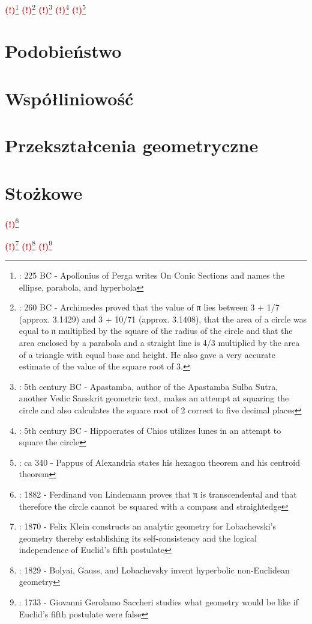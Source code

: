 \documentclass{greaseproof}
\newcommand{\todofoot}[1]{\textcolor{red}{\textbf{(!)}\footnote{\textbf{\color{red}{Do zrobienia}}: #1}}}
\begin{document}
\todofoot{225 BC - Apollonius of Perga writes On Conic Sections and names the ellipse, parabola, and hyperbola}
\todofoot{260 BC - Archimedes proved that the value of π lies between 3 + 1/7 (approx. 3.1429) and 3 + 10/71 (approx. 3.1408), that the area of a circle was equal to π multiplied by the square of the radius of the circle and that the area enclosed by a parabola and a straight line is 4/3 multiplied by the area of a triangle with equal base and height. He also gave a very accurate estimate of the value of the square root of 3.}
\todofoot{5th century BC - Apastamba, author of the Apastamba Sulba Sutra, another Vedic Sanskrit geometric text, makes an attempt at squaring the circle and also calculates the square root of 2 correct to five decimal places}
\todofoot{5th century BC - Hippocrates of Chios utilizes lunes in an attempt to square the circle}
\todofoot{ca 340 - Pappus of Alexandria states his hexagon theorem and his centroid theorem}

\chapter{Podobieństwo}


\chapter{Współliniowość}


\chapter{Przekształcenia geometryczne}


\chapter{Stożkowe}



\todofoot{1882 - Ferdinand von Lindemann proves that π is transcendental and that therefore the circle cannot be squared with a compass and straightedge}


\todofoot{1870 - Felix Klein constructs an analytic geometry for Lobachevski's geometry thereby establishing its self-consistency and the logical independence of Euclid's fifth postulate}
\todofoot{1829 - Bolyai, Gauss, and Lobachevsky invent hyperbolic non-Euclidean geometry}
\todofoot{1733 - Giovanni Gerolamo Saccheri studies what geometry would be like if Euclid's fifth postulate were false}
\end{document}

